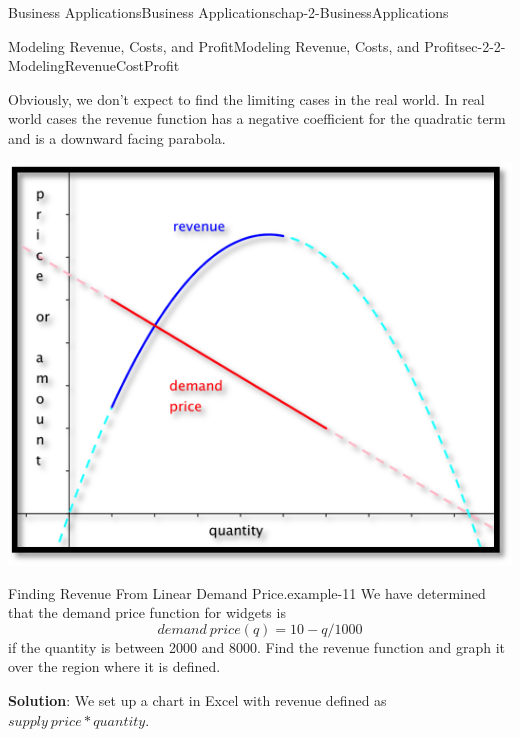 \documentclass[oneside,10pt,]{book}
\newcommand{\terminology}[1]{\textbf{#1}}
\numberwithin{equation}{section}
\begin{document}
\begin{chapterptx}{Business Applications}{}{Business Applications}{}{}{chap-2-BusinessApplications}
\begin{sectionptx}{Modeling Revenue, Costs, and Profit}{}{Modeling Revenue, Costs, and Profit}{}{}{sec-2-2-ModelingRevenueCostProfit}
\begin{sidebyside}{1}{0.2}{0.2}{0}
\begin{sbspanel}{0.6}
\end{sbspanel}%
\end{sidebyside}%
\par
\hypertarget{p-639}{}%
Obviously, we don’t expect to find the limiting cases in the real world.  In real world cases the revenue function has a negative coefficient for the quadratic term and is a downward facing parabola.%
\begin{sidebyside}{1}{0.2}{0.2}{0}%
\begin{sbspanel}{0.6}%
\includegraphics[width=1\linewidth]{images/sec2-2-2.png}
\end{sbspanel}%
\end{sidebyside}%
\begin{example}{Finding Revenue From Linear Demand Price.}{example-11}%
\hypertarget{p-640}{}%
We have determined that the demand price function for widgets is%
%
\begin{equation*}
demand\ price(q)=10-q/1000
\end{equation*}
\hypertarget{p-641}{}%
if the quantity is between 2000 and 8000.  Find the revenue function and graph it over the region where it is defined.%
\par
\hypertarget{p-642}{}%
\terminology{Solution}: We set up a chart in Excel with revenue defined as \(supply\ price * quantity\).%
\begin{sidebyside}{1}{0.2}{0.2}{0}%
\begin{sbspanel}{0.6}%

\end{sbspanel}
\end{sidebyside}
\end{example}
\end{sectionptx}
\end{chapterptx}
\end{document}
